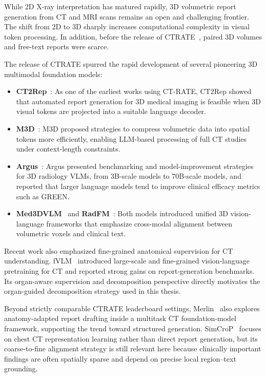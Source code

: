 While 2D X-ray interpretation has matured rapidly, 3D volumetric report generation from CT and MRI scans remains an open and challenging frontier. The shift from 2D to 3D sharply increases computational complexity in visual token processing. In addition, before the release of \ac{CTRATE}~\cite{hamamci2024foundation}, paired 3D volumes and free-text reports were scarce.

The release of \ac{CTRATE} spurred the rapid development of several pioneering 3D multimodal foundation models:

\begin{itemize}
    \item \textbf{CT2Rep}~\cite{hamamci2024ct2rep}: As one of the earliest works using CT-RATE, CT2Rep showed that automated report generation for 3D medical imaging is feasible when 3D visual tokens are projected into a suitable language decoder.
    \item \textbf{M3D}~\cite{bai2024m3d}: M3D proposed strategies to compress volumetric data into spatial tokens more efficiently, enabling LLM-based processing of full CT studies under context-length constraints.
    \item \textbf{Argus}~\cite{argus2024}: Argus presented benchmarking and model-improvement strategies for 3D radiology VLMs, from 3B-scale models to 70B-scale models, and reported that larger language models tend to improve clinical efficacy metrics such as GREEN.
    \item \textbf{Med3DVLM}~\cite{med3dvlm2024} and \textbf{RadFM}~\cite{radfm2024}: Both models introduced unified 3D vision-language frameworks that emphasize cross-modal alignment between volumetric voxels and clinical text.
\end{itemize}

Recent work also emphasized fine-grained anatomical supervision for CT understanding. fVLM~\cite{shui2025fvlm} introduced large-scale and fine-grained vision-language pretraining for CT and reported strong gains on report-generation benchmarks. Its organ-aware supervision and decomposition perspective directly motivates the organ-guided decomposition strategy used in this thesis.

Beyond strictly comparable \ac{CTRATE} leaderboard settings, Merlin~\cite{Blankemeier_2026} also explores anatomy-adapted report drafting inside a multitask CT foundation-model framework, supporting the trend toward structured generation. SimCroP~\cite{wang2025simcropradiographrepresentationlearning} focuses on chest CT representation learning rather than direct report generation, but its coarse-to-fine alignment strategy is still relevant here because clinically important findings are often spatially sparse and depend on precise local region--text grounding.

